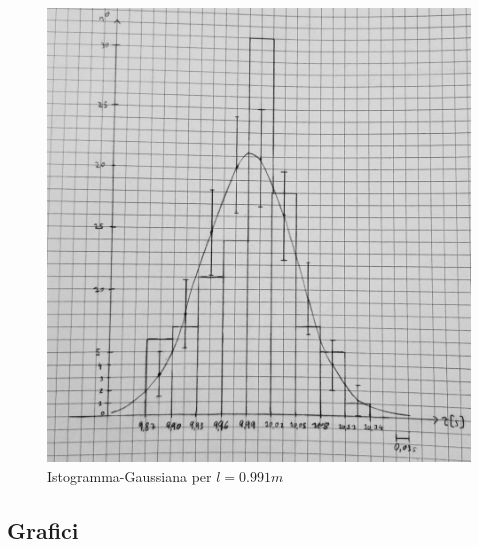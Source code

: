 \documentclass[a4paper]{article}
\begin{document}
\begin{figure}[!h]
    \centering
    \includegraphics[width=\textwidth]{fotopendolo/gaussiana.jpg}
    \caption{Istogramma-Gaussiana per $l=0.991m$}
\end{figure}
\FloatBarrier

\newpage
\subsection{Grafici}
\end{document}
